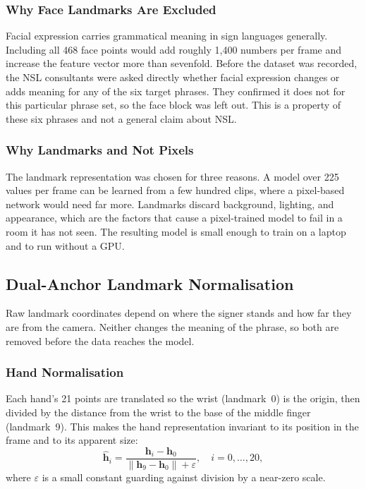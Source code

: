 \subsubsection{Why Face Landmarks Are Excluded}
Facial expression carries grammatical meaning in sign languages generally. Including all 468 face points would add roughly 1{,}400 numbers per frame and increase the feature vector more than sevenfold. Before the dataset was recorded, the NSL consultants were asked directly whether facial expression changes or adds meaning for any of the six target phrases. They confirmed it does not for this particular phrase set, so the face block was left out. This is a property of these six phrases and not a general claim about NSL.

\subsubsection{Why Landmarks and Not Pixels}
The landmark representation was chosen for three reasons. A model over 225 values per frame can be learned from a few hundred clips, where a pixel-based network would need far more. Landmarks discard background, lighting, and appearance, which are the factors that cause a pixel-trained model to fail in a room it has not seen. The resulting model is small enough to train on a laptop and to run without a GPU.

\subsection{Dual-Anchor Landmark Normalisation}
\label{sec:normalisation}
Raw landmark coordinates depend on where the signer stands and how far they are from the camera. Neither changes the meaning of the phrase, so both are removed before the data reaches the model.

\subsubsection{Hand Normalisation}
Each hand's 21 points are translated so the wrist (landmark~0) is the origin, then divided by the distance from the wrist to the base of the middle finger (landmark~9). This makes the hand representation invariant to its position in the frame and to its apparent size:
\[
    \hat{\mathbf{h}}_i = \frac{\mathbf{h}_i - \mathbf{h}_0}{\|\mathbf{h}_9 - \mathbf{h}_0\| + \varepsilon},
    \quad i = 0,\dots,20,
\]
where $\varepsilon$ is a small constant guarding against division by a near-zero scale.

